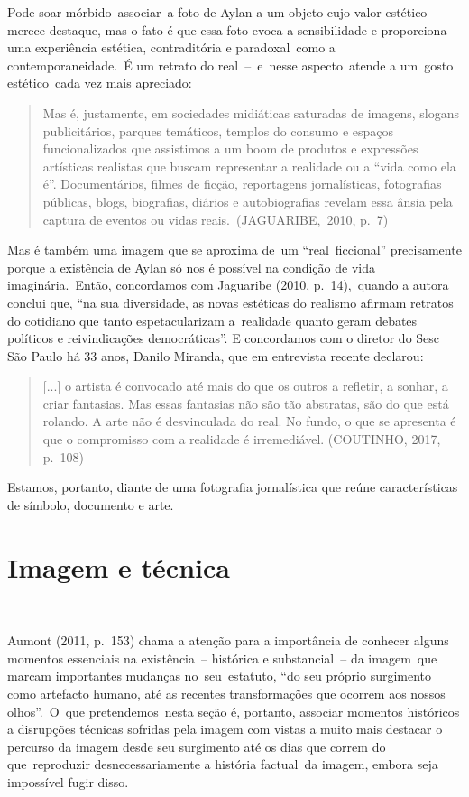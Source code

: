 \documentclass[
  letterpaper,
]{scrbook}
\begin{document}
Pode soar mórbido~associar~a foto de Aylan a um objeto cujo valor
estético merece destaque, mas o fato é que essa foto evoca a
sensibilidade e proporciona uma experiência estética, contraditória e
paradoxal~como a contemporaneidade.~É um retrato do real~--~e~nesse
aspecto~atende a um~gosto estético~cada vez mais apreciado:~ ~

\begin{quote}
Mas é, justamente, em sociedades midiáticas saturadas de imagens,
slogans publicitários, parques temáticos, templos do consumo e espaços
funcionalizados que assistimos a um boom de produtos e expressões
artísticas realistas que buscam representar a realidade ou a ``vida como
ela é''. Documentários, filmes de ficção, reportagens jornalísticas,
fotografias públicas, blogs, biografias, diários e autobiografias
revelam essa ânsia pela captura de eventos ou vidas
reais.~(JAGUARIBE,~2010, p.~7)~
\end{quote}

Mas é também uma imagem que se aproxima de~um ``real~ficcional''
precisamente porque a existência de Aylan só nos é possível na condição
de vida imaginária.~Então, concordamos com Jaguaribe (2010,
p.~14),~quando a autora conclui que, ``na sua diversidade, as novas
estéticas do realismo afirmam retratos do cotidiano que tanto
espetacularizam a~realidade quanto geram debates políticos e
reivindicações democráticas''. E concordamos com o diretor do Sesc São
Paulo há 33 anos, Danilo Miranda, que em entrevista recente declarou:

\begin{quote}
{[}...{]} o artista é convocado até mais do que os outros a refletir, a
sonhar, a criar fantasias. Mas essas fantasias não são tão abstratas,
são do que está rolando. A arte não é desvinculada do real. No fundo, o
que se apresenta é que o compromisso com a realidade é irremediável.
(COUTINHO, 2017, p.~108)
\end{quote}

Estamos, portanto, diante de uma fotografia jornalística que reúne
características de símbolo, documento e arte. ~

\hypertarget{imagem-e-tuxe9cnica}{%
\section{Imagem e técnica}\label{imagem-e-tuxe9cnica}}

~

Aumont (2011, p.~153) chama a atenção para a importância de conhecer
alguns momentos essenciais na existência~-- histórica e substancial~--
da imagem~que marcam importantes mudanças no~seu~estatuto, ``do seu
próprio surgimento como artefacto humano, até as recentes transformações
que ocorrem aos nossos olhos''.~O~que pretendemos~nesta seção é,
portanto, associar momentos históricos a disrupções técnicas sofridas
pela imagem com vistas a muito mais destacar o percurso da imagem desde
seu surgimento até os dias que correm do que~reproduzir
desnecessariamente a história factual~da imagem, embora seja impossível
fugir disso.~
\end{document}
